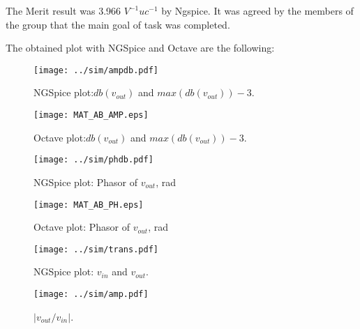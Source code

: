 The Merit result was 3.966 $V^{-1}uc^{-1}$ by Ngspice. It was agreed by the members of the group that the main goal of task was completed.

\newpage
The obtained plot with NGSpice and Octave are the following:

\begin{figure}[h] \centering
	\vspace{-3cm}
	\texttt{[image: ../sim/ampdb.pdf]}
	\caption{NGSpice plot:$db(v_{out})$ and $max(db(v_{out}))-3$.}
	\label{fig:MAT_OUT}
\end{figure}

\begin{figure}[h] \centering
	\texttt{[image: MAT\_AB\_AMP.eps]}
	\caption{Octave plot:$db(v_{out})$ and $max(db(v_{out}))-3$.}
	\label{fig:SIM_OUT}
\end{figure}

\newpage

\begin{figure}[h] \centering
	\vspace{-3cm}
	\texttt{[image: ../sim/phdb.pdf]}
	\caption{NGSpice plot: Phasor of $v_{out}$, rad}
	\label{fig:MAT_PH}
\end{figure}

\begin{figure}[h] \centering
	\texttt{[image: MAT\_AB\_PH.eps]}
	\caption{Octave plot: Phasor of $v_{out}$, rad}
	\label{fig:SIM_PH}
\end{figure}

\newpage

\begin{figure}[h] \centering
	\vspace{-3cm}
	\texttt{[image: ../sim/trans.pdf]}
	\caption{NGSpice plot: $v_{in}$ and $v_{out}$.}
\end{figure}

\begin{figure}[h] \centering
	\vspace{-3cm}
	\texttt{[image: ../sim/amp.pdf]}
	\caption{$ \left | v_{out}/v_{in} \right |$.}
	\vspace{-2cm}
\end{figure}
